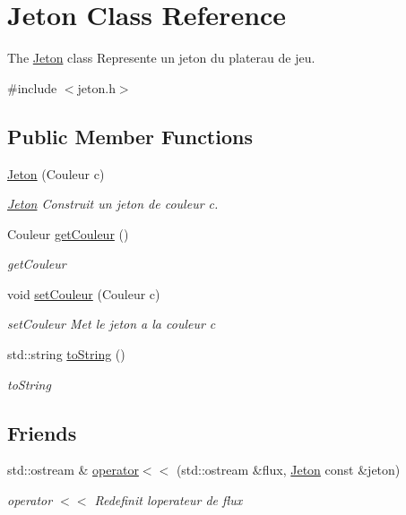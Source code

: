 \hypertarget{class_jeton}{}\section{Jeton Class Reference}
\label{class_jeton}


The \hyperlink{class_jeton}{Jeton} class Represente un jeton du platerau de jeu.  




{\ttfamily \#include $<$jeton.\+h$>$}

\subsection*{Public Member Functions}
\begin{DoxyCompactItemize}
\item 
\hyperlink{class_jeton_a77f66ee637c4f1a766bfb64b8ef6f8ba}{Jeton} (Couleur c)
\begin{DoxyCompactList}\small\item\em \hyperlink{class_jeton}{Jeton} Construit un jeton de couleur c. \end{DoxyCompactList}\item 
Couleur \hyperlink{class_jeton_a166069d025a1037af5fc31e2b992a307}{get\+Couleur} ()
\begin{DoxyCompactList}\small\item\em get\+Couleur \end{DoxyCompactList}\item 
void \hyperlink{class_jeton_a9bae7bb244c34f1074b2fc5ceeea6df9}{set\+Couleur} (Couleur c)
\begin{DoxyCompactList}\small\item\em set\+Couleur Met le jeton a la couleur c \end{DoxyCompactList}\item 
std\+::string \hyperlink{class_jeton_ab4ecbafc53013008034df45aae7f6db0}{to\+String} ()
\begin{DoxyCompactList}\small\item\em to\+String \end{DoxyCompactList}\end{DoxyCompactItemize}
\subsection*{Friends}
\begin{DoxyCompactItemize}
\item 
std\+::ostream \& \hyperlink{class_jeton_a89706da93c67287bd8bc570ffa898a5d}{operator$<$$<$} (std\+::ostream \&flux, \hyperlink{class_jeton}{Jeton} const \&jeton)
\begin{DoxyCompactList}\small\item\em operator $<$$<$ Redefinit l\textquotesingle{}operateur de flux \end{DoxyCompactList}\end{DoxyCompactItemize}


